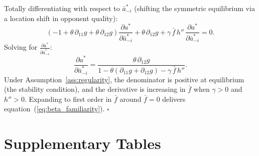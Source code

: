 \documentclass[12pt]{article}
\theoremstyle{definition}
\theoremstyle{remark}
\begin{document}
Totally differentiating with respect to $\bar{a}_{-i}^*$ (shifting the symmetric
equilibrium via a location shift in opponent quality):
\[
\left(-1 + \theta\,\partial_{11}g + \theta\,\partial_{12}g\right)\frac{\partial a^*}{\partial \bar{a}_{-i}^*}
+ \theta\,\partial_{12}g + \gamma\,\bar{f}\,h''\,\frac{\partial a^*}{\partial \bar{a}_{-i}^*} = 0.
\]
Solving for $\frac{\partial a^*}{\partial \bar{a}_{-i}^*}$:
\[
\frac{\partial a^*}{\partial \bar{a}_{-i}^*}
= \frac{\theta\,\partial_{12}g}{1 - \theta(\partial_{11}g + \partial_{12}g) - \gamma\,\bar{f}\,h''}.
\]
Under Assumption~\ref{ass:regularity}, the denominator is positive at equilibrium
(the stability condition), and the derivative is increasing in $\bar{f}$ when
$\gamma > 0$ and $h'' > 0$.
Expanding to first order in $\bar{f}$ around $\bar{f}=0$ delivers
equation~(\ref{eq:beta_familiarity}).
$\square$

\section{Supplementary Tables}
\label{app:tables}
\end{document}
